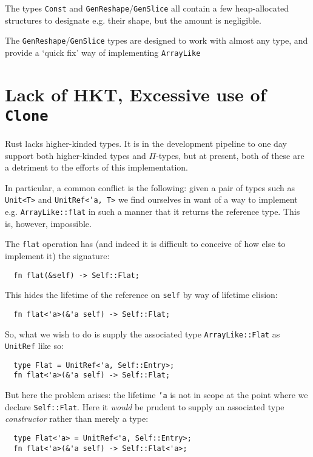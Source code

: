 \documentclass{DIKU-report-variant}
\begin{document}
The types \texttt{Const} and \texttt{GenReshape}/\texttt{GenSlice} all contain a few heap-allocated
structures to designate e.g. their shape, but the amount is negligible.

The \texttt{GenReshape}/\texttt{GenSlice} types are designed to work with almost any type, and
provide a `quick fix' way of implementing \texttt{ArrayLike}

\section{Lack of HKT, Excessive use of \texttt{Clone}}

Rust lacks higher-kinded types. It is in the development pipeline to one day support both higher-kinded
types and \(\Pi\)-types, but at present, both of these are a detriment to the efforts of this implementation.

In particular, a common conflict is the following: given a pair of types such as \texttt{Unit<T>} and
\texttt{UnitRef<'a, T>} we find ourselves in want of a way to implement e.g. \texttt{ArrayLike::flat}
in such a manner that it returns the reference type. This is, however, impossible.

The \texttt{flat} operation has (and indeed it is difficult to conceive of how else to implement it) the
signature:

\begin{lstlisting}
  fn flat(&self) -> Self::Flat;
\end{lstlisting}

This hides the lifetime of the reference on \texttt{self} by way of lifetime elision:

\begin{lstlisting}
  fn flat<'a>(&'a self) -> Self::Flat;
\end{lstlisting}

So, what we wish to do is supply the associated type \texttt{ArrayLike::Flat} as \texttt{UnitRef} like
so:

\begin{lstlisting}
  type Flat = UnitRef<'a, Self::Entry>;
  fn flat<'a>(&'a self) -> Self::Flat;
\end{lstlisting}

But here the problem arises: the lifetime \texttt{'a} is not in scope at the point where we declare
\texttt{Self::Flat}. Here it \emph{would} be prudent to supply an associated type \emph{constructor}
rather than merely a type:

\begin{lstlisting}
  type Flat<'a> = UnitRef<'a, Self::Entry>;
  fn flat<'a>(&'a self) -> Self::Flat<'a>;
\end{lstlisting}
\end{document}
